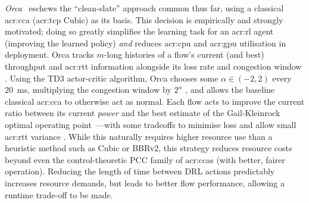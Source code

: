 \emph{Orca}~\parencite{DBLP:conf/sigcomm/AbbaslooYC20} eschews the ``clean-slate'' approach common thus far, using a classical \gls{acr:cca} (\gls{acr:tcp} Cubic) as its basis.
This decision is empirically and strongly motivated; doing so greatly simplifies the learning task for an \gls{acr:rl} agent (improving the learned policy) \emph{and} reduces \gls{acr:cpu} and \gls{acr:gpu} utilisation in deployment.
Orca tracks $m$-long histories of a flow's current (and best) throughput and \gls{acr:rtt} information alongside its loss rate and congestion window \prllitstate.
Using the TD3 actor-critic algorithm, Orca chooses some $\alpha\in\left(-2, 2\right)$ every \qty{20}{\milli\second}, multiplying the congestion window by $2^\alpha$ \prllitactreal, and allows the baseline classical \gls{acr:cca} to otherwise act as normal.
Each flow acts to improve the current ratio between its current \emph{power} and the best estimate of the Gail-Kleinrock optimal operating point~\parencite{KleinrockPoint1,KleinrockPoint2}---with some tradeoffs to minimise loss and allow small \gls{acr:rtt} variance \prllitreward.
While this naturally requires higher resource use than a heuristic method such as Cubic or BBRv2, this strategy reduces resource costs beyond even the control-theoretic PCC family of \glspl{acr:cca} (with better, fairer operation).
Reducing the length of time between DRL actions predictably increases resource demands, but leads to better flow performance, allowing a runtime trade-off to be made.

